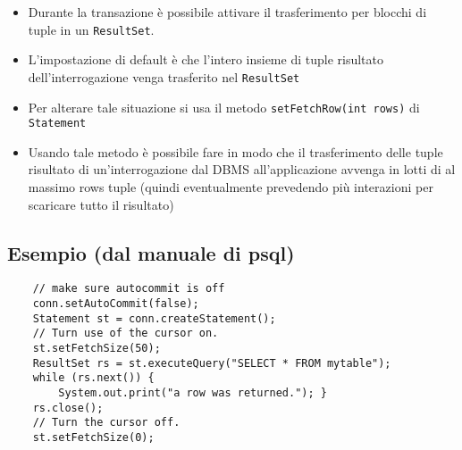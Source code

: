 \documentclass[a4paper, 10pt]{article}
\theoremstyle{definition}
\begin{document}
		\begin{itemize}
			\item Durante la transazione è possibile attivare il trasferimento
			per blocchi di tuple in un \lstinline|ResultSet|.
			\item L’impostazione di default è che l’intero insieme di tuple
			risultato dell’interrogazione venga trasferito nel \lstinline|ResultSet|
			\item Per alterare tale situazione si usa il metodo
			\lstinline|setFetchRow(int rows)| di \lstinline|Statement|
			\item Usando tale metodo è possibile fare in modo che il
			trasferimento delle tuple risultato di un’interrogazione dal
			DBMS all’applicazione avvenga in lotti di al massimo rows
			tuple (quindi eventualmente prevedendo più interazioni per
			scaricare tutto il risultato)
		\end{itemize}
		\vspace*{-0.5cm}
		\subsection*{Esempio (dal manuale di psql)}

			\begin{lstlisting}
	// make sure autocommit is off
	conn.setAutoCommit(false);
	Statement st = conn.createStatement();
	// Turn use of the cursor on.
	st.setFetchSize(50);
	ResultSet rs = st.executeQuery("SELECT * FROM mytable");
	while (rs.next()) {
		System.out.print("a row was returned."); }
	rs.close();
	// Turn the cursor off.
	st.setFetchSize(0);
			\end{lstlisting}
			
\end{document}

